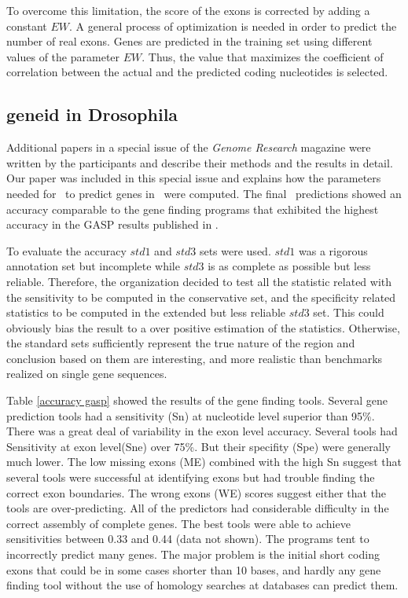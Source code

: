To overcome this limitation, the score of the exons is corrected by
adding a constant $EW$. A general process of optimization is needed in
order to predict the number of real exons. Genes are predicted in the
training set using different values of the parameter $EW$. Thus, the
value that maximizes the coefficient of correlation between the actual
and the predicted coding nucleotides is selected.


\subsection{geneid in Drosophila}

Additional papers in a special issue of the {\it Genome Research}
magazine were written by the participants and describe their methods
and the results in detail. Our paper was included in this special
issue and explains how the parameters needed for \geneid\ to predict
genes in \Dm\ were computed. The final \geneid\ predictions showed
an accuracy comparable to the gene finding programs that exhibited the
highest accuracy in the GASP results published in \cite{reese:2000a}.


To evaluate the accuracy $std1$ and $std3$ sets were used. $std1$ was
a rigorous annotation set but incomplete while $std3$ is as complete
as possible but less reliable. Therefore, the organization decided to
test all the statistic related with the sensitivity to be computed in
the conservative set, and the specificity related statistics to be
computed in the extended but less reliable $std3$ set. This could
obviously bias the result to a over positive estimation of the
statistics. Otherwise, the standard sets sufficiently represent the
true nature of the region and conclusion based on them are
interesting, and more realistic than benchmarks realized on single
gene sequences.

Table \ref{accuracy gasp} showed the results of the gene finding
tools. Several gene prediction tools had a sensitivity (Sn) at
nucleotide level superior than 95\%. There was a great deal of
variability in the exon level accuracy. Several tools had Sensitivity
at exon level(Sne) over 75\%. But their specifity (Spe) were generally
much lower. The low missing exons (ME) combined with the high Sn
suggest that several tools were successful at identifying exons but
had trouble finding the correct exon boundaries. The wrong exons (WE)
scores suggest either that the tools are over-predicting. All of the
predictors had considerable difficulty in the correct assembly of
complete genes. The best tools were able to achieve sensitivities
between 0.33 and 0.44 (data not shown). The programs tent to
incorrectly predict many genes. The major problem is the initial short
coding exons that could be in some cases shorter than 10 bases, and
hardly any gene finding tool without the use of homology searches at
databases can predict them.


